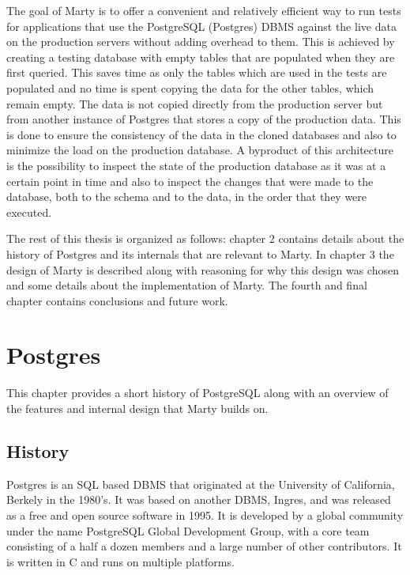 \documentclass[a4paper,12pt,twoside,BCOR=10mm]{scrbook}
\begin{document}
The goal of Marty is to offer a convenient and relatively efficient way to run tests for applications that use the PostgreSQL (Postgres) DBMS against the live data on the production servers without adding overhead to them. This is achieved by creating a testing database with empty tables that are populated  when they are first queried. This saves time as only the tables which are used in the tests are populated and no time is spent copying the data for the other tables, which remain empty. The data is not copied directly from the production server but from another instance of Postgres that stores a copy of the production data. This is done to ensure the consistency of the data in the cloned databases and also to minimize the load on the production database. A byproduct of this architecture is the possibility to inspect the state of the production database as it was at a certain point in time and also to inspect the changes that were made to the database, both to the schema and to the data, in the order that they were executed.

The rest of this thesis is organized as follows: chapter 2 contains details about the history of Postgres and its internals that are relevant to Marty. In chapter 3 the design of Marty is described along with reasoning for why this design was chosen and some details about the implementation of Marty. The fourth and final chapter contains conclusions and future work.


\chapter{Postgres}
This chapter provides a short history of PostgreSQL along with an overview of the features and internal design that Marty builds on.

\section{History}
Postgres is an SQL based DBMS that originated at the University of California, Berkely in the 1980's. It was based on another DBMS, Ingres, and was released as a free and open source software in 1995. It is developed by a global community under the name PostgreSQL Global Development Group, with a core team consisting of a half a dozen members and a large number of other contributors. It is written in C and runs on multiple platforms.
\end{document}
